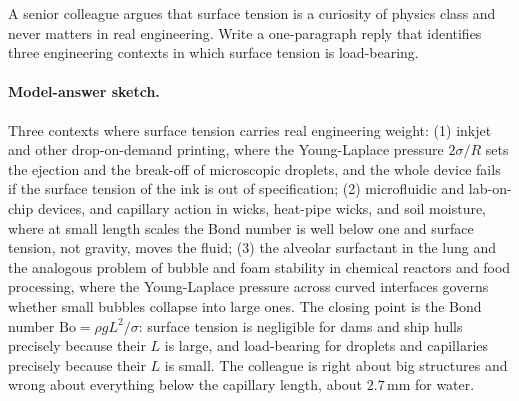 \begin{exercise}
A senior colleague argues that surface tension is a curiosity
of physics class and never matters in real engineering. Write a
one-paragraph reply that identifies three engineering contexts
in which surface tension is load-bearing.

\paragraph{Model-answer sketch.} Three contexts where surface tension
carries real engineering weight: (1) inkjet and other drop-on-demand
printing, where the Young-Laplace pressure $2\sigma/R$ sets the
ejection and the break-off of microscopic droplets, and the whole device
fails if the surface tension of the ink is out of specification; (2)
microfluidic and lab-on-chip devices, and capillary action in wicks,
heat-pipe wicks, and soil moisture, where at small length scales the
Bond number is well below one and surface tension, not gravity, moves
the fluid; (3) the alveolar surfactant in the lung and the analogous
problem of bubble and foam stability in chemical reactors and food
processing, where the Young-Laplace pressure across curved interfaces
governs whether small bubbles collapse into large ones. The closing
point is the Bond number $\text{Bo} = \rho g L^2/\sigma$: surface
tension is negligible for dams and ship hulls precisely because their
$L$ is large, and load-bearing for droplets and capillaries precisely
because their $L$ is small. The colleague is right about big structures
and wrong about everything below the capillary length, about
$2.7\,\si{\milli\meter}$ for water.
\end{exercise}

